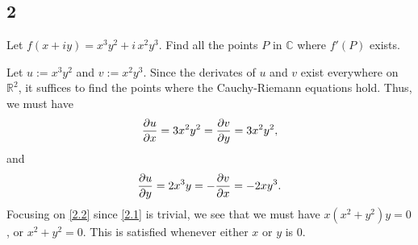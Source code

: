 \documentclass[12pt]{article}
\begin{document}
\newpage
\subsection*{2}
\begin{tcolorbox}
Let $f(x+iy)=x^3y^2+i\,x^2y^3$. Find all the points $P$ in $\mathbb{C}$ where $f'(P)$ exists.
\end{tcolorbox}
Let $u := x^{3}y^{2}$ and $v := x^{2}y^{3}$. Since the derivates of $u$ and $v$ exist everywhere on $\mathbb{R}^{2}$, it suffices to find the points
where the Cauchy-Riemann equations hold. Thus, we must have
\begin{equation}
\frac{\partial u}{\partial x} = 3x^{2}y^{2} = \frac{\partial v}{\partial y} = 3x^{2}y^{2},
\label{2.1}
\end{equation}
and 
\begin{equation}
\frac{\partial u}{\partial y} = 2x^{3}y = -\frac{\partial v}{\partial x} = -2xy^{3}.
\label{2.2}
\end{equation}
Focusing on \eqref{2.2} since \eqref{2.1} is trivial, we see that we must have $x(x^{2} + y^{2})y = 0$, or $x^{2} + y^{2} = 0$. This is satisfied
whenever either $x$ or $y$ is 0.
\end{document}

